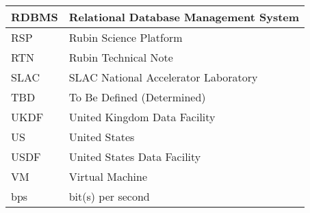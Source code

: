 \begin{longtable}{p{}p{}}
RDBMS & Relational Database Management System  \\\hline
RSP & Rubin Science Platform \\\hline
RTN & Rubin Technical Note \\\hline
SLAC & SLAC National Accelerator Laboratory \\\hline
TBD & To Be Defined (Determined) \\\hline
UKDF & United Kingdom Data Facility \\\hline
US & United States \\\hline
USDF & United States Data Facility \\\hline
VM & Virtual Machine \\\hline
bps & bit(s) per second \\\hline
\end{longtable}
